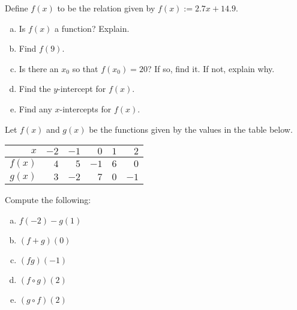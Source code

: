 \documentclass[11pt,letterpaper]{article}
\begin{document}
\newpage



 Define $f(x)$ to be the relation given by $f(x):= 2.7x + 14.9$.
	\begin{enumerate}[(a)]
	\item Is $f(x)$ a function? Explain.
	\item Find $f(9)$.
	\item Is there an $x_0$ so that $f(x_0)= 20$? If so, find it. If not, explain why. 
	\item Find the $y$-intercept for $f(x)$. 
	\item Find any $x$-intercepts for $f(x)$.
	\end{enumerate}



\newpage



 Let $f(x)$ and $g(x)$ be the functions given by the values in the table below. \par
	\begin{table}[H]
	\centering
	\begin{tabular}{r||rrrrr}
	$x$ & $-2$ & $-1$ & $0$ & $1$ & $2$ \\ \hline
	$f(x)$ & $4$ & $5$ & $-1$ & $6$ & $0$ \\
	$g(x)$ & $3$ & $-2$ & $7$ & $0$ & $-1$
	\end{tabular}
	\end{table} \par
Compute the following:
	\begin{enumerate}[(a)]
	\item $f(-2) - g(1)$ 
	\item $(f + g)(0)$
	\item $(fg)(-1)$
	\item $(f \circ g)(2)$
	\item $(g \circ f)(2)$
	\end{enumerate}
\end{document}
